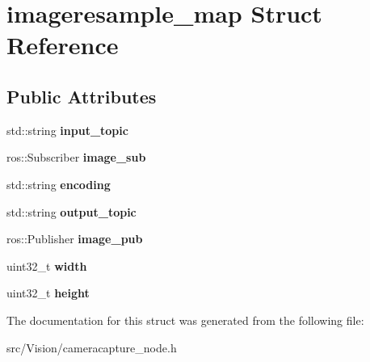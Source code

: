 \hypertarget{structimageresample__map}{}\section{imageresample\+\_\+map Struct Reference}
\label{structimageresample__map}
\subsection*{Public Attributes}
\begin{DoxyCompactItemize}
\item 
\mbox{\label{structimageresample__map_abb9fa401726ca4f99767c5c8cf5682b0}} 
std\+::string {\bfseries input\+\_\+topic}
\item 
\mbox{\label{structimageresample__map_ad2554492d79409a891a752cc4907fd3f}} 
ros\+::\+Subscriber {\bfseries image\+\_\+sub}
\item 
\mbox{\label{structimageresample__map_af21757b73d14092c2effd4d774881f08}} 
std\+::string {\bfseries encoding}
\item 
\mbox{\label{structimageresample__map_af9d62e5baeff7bb6b63f55a315474f88}} 
std\+::string {\bfseries output\+\_\+topic}
\item 
\mbox{\label{structimageresample__map_aa7c451ce6c13d9d576c93f064f64a40c}} 
ros\+::\+Publisher {\bfseries image\+\_\+pub}
\item 
\mbox{\label{structimageresample__map_aaf8deac72a2e59cd8e0fd8eef789c615}} 
uint32\+\_\+t {\bfseries width}
\item 
\mbox{\label{structimageresample__map_a0f835cbf9cae2d3b8ce74c924e510195}} 
uint32\+\_\+t {\bfseries height}
\end{DoxyCompactItemize}


The documentation for this struct was generated from the following file\+:\begin{DoxyCompactItemize}
\item 
src/\+Vision/cameracapture\+\_\+node.\+h\end{DoxyCompactItemize}
